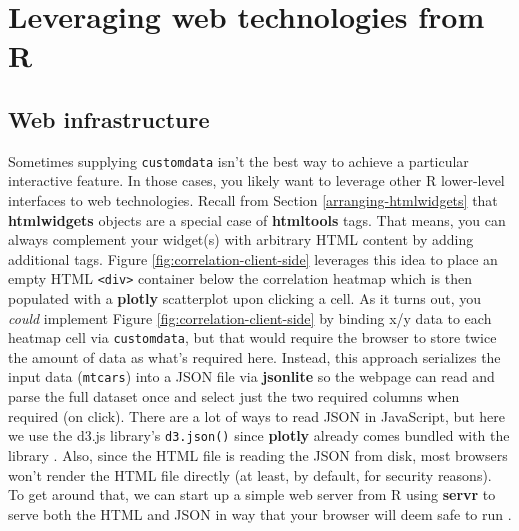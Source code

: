 \documentclass[
  12pt,
]{krantz}
\begin{document}
\hypertarget{client-side}{%
\chapter{Leveraging web technologies from R}\label{client-side}}

\hypertarget{web-infrastructure}{%
\section{Web infrastructure}\label{web-infrastructure}}


Sometimes supplying \texttt{customdata} isn't the best way to achieve a particular interactive feature. In those cases, you likely want to leverage other R lower-level interfaces to web technologies. Recall from Section \ref{arranging-htmlwidgets} that \textbf{htmlwidgets} objects are a special case of \textbf{htmltools} tags. That means, you can always complement your widget(s) with arbitrary HTML content by adding additional tags. Figure \ref{fig:correlation-client-side} leverages this idea to place an empty HTML \texttt{\textless{}div\textgreater{}} container below the correlation heatmap which is then populated with a \textbf{plotly} scatterplot upon clicking a cell. As it turns out, you \emph{could} implement Figure \ref{fig:correlation-client-side} by binding x/y data to each heatmap cell via \texttt{customdata}, but that would require the browser to store twice the amount of data as what's required here. Instead, this approach serializes the input data (\texttt{mtcars}) into a JSON file via \textbf{jsonlite} so the webpage can read and parse the full dataset once and select just the two required columns when required (on click). There are a lot of ways to read JSON in JavaScript, but here we use the d3.js library's \texttt{d3.json()} since \textbf{plotly} already comes bundled with the library \citep{d3js}. Also, since the HTML file is reading the JSON from disk, most browsers won't render the HTML file directly (at least, by default, for security reasons). To get around that, we can start up a simple web server from R using \textbf{servr} to serve both the HTML and JSON in way that your browser will deem safe to run \citep{servr}.
\end{document}
